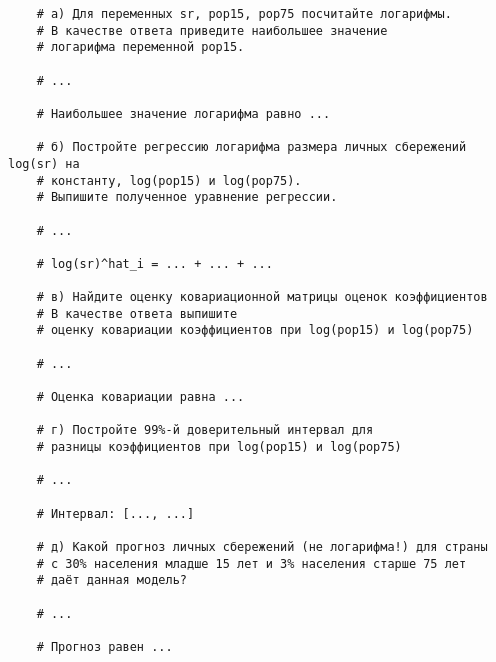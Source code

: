 \documentclass[12pt]{article}
\begin{document}
\begin{enumerate}
\begin{verbatim}
    # а) Для переменных sr, pop15, pop75 посчитайте логарифмы. 
    # В качестве ответа приведите наибольшее значение 
    # логарифма переменной pop15.

    # ...

    # Наибольшее значение логарифма равно ... 

    # б) Постройте регрессию логарифма размера личных сбережений log(sr) на 
    # константу, log(pop15) и log(pop75).
    # Выпишите полученное уравнение регрессии. 

    # ...

    # log(sr)^hat_i = ... + ... + ... 

    # в) Найдите оценку ковариационной матрицы оценок коэффициентов
    # В качестве ответа выпишите  
    # оценку ковариации коэффициентов при log(pop15) и log(pop75)

    # ... 

    # Оценка ковариации равна ...

    # г) Постройте 99%-й доверительный интервал для 
    # разницы коэффициентов при log(pop15) и log(pop75)

    # ...

    # Интервал: [..., ...]

    # д) Какой прогноз личных сбережений (не логарифма!) для страны 
    # с 30% населения младше 15 лет и 3% населения старше 75 лет 
    # даёт данная модель?
    
    # ...

    # Прогноз равен ...
\end{verbatim}



\end{enumerate}
\end{document}
